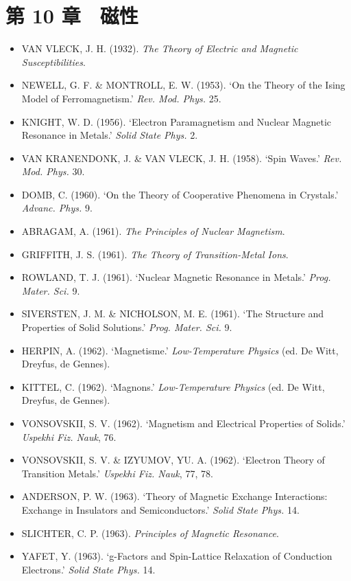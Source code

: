 \section*{第 10 章　磁性}

\begin{itemize}[leftmargin=2em, itemsep=0.2em]
\item VAN VLECK, J. H. (1932). \emph{The Theory of Electric and Magnetic Susceptibilities}.
\item NEWELL, G. F. \& MONTROLL, E. W. (1953). `On the Theory of the Ising Model of Ferromagnetism.' \emph{Rev. Mod. Phys.} 25.
\item KNIGHT, W. D. (1956). `Electron Paramagnetism and Nuclear Magnetic Resonance in Metals.' \emph{Solid State Phys.} 2.
\item VAN KRANENDONK, J. \& VAN VLECK, J. H. (1958). `Spin Waves.' \emph{Rev. Mod. Phys.} 30.
\item DOMB, C. (1960). `On the Theory of Cooperative Phenomena in Crystals.' \emph{Advanc. Phys.} 9.
\item ABRAGAM, A. (1961). \emph{The Principles of Nuclear Magnetism}.
\item GRIFFITH, J. S. (1961). \emph{The Theory of Transition-Metal Ions}.
\item ROWLAND, T. J. (1961). `Nuclear Magnetic Resonance in Metals.' \emph{Prog. Mater. Sci.} 9.
\item SIVERSTEN, J. M. \& NICHOLSON, M. E. (1961). `The Structure and Properties of Solid Solutions.' \emph{Prog. Mater. Sci.} 9.
\item HERPIN, A. (1962). `Magnetisme.' \emph{Low-Temperature Physics} (ed. De Witt, Dreyfus, de Gennes).
\item KITTEL, C. (1962). `Magnons.' \emph{Low-Temperature Physics} (ed. De Witt, Dreyfus, de Gennes).
\item VONSOVSKII, S. V. (1962). `Magnetism and Electrical Properties of Solids.' \emph{Uspekhi Fiz. Nauk}, 76.
\item VONSOVSKII, S. V. \& IZYUMOV, YU. A. (1962). `Electron Theory of Transition Metals.' \emph{Uspekhi Fiz. Nauk}, 77, 78.
\item ANDERSON, P. W. (1963). `Theory of Magnetic Exchange Interactions: Exchange in Insulators and Semiconductors.' \emph{Solid State Phys.} 14.
\item SLICHTER, C. P. (1963). \emph{Principles of Magnetic Resonance}.
\item YAFET, Y. (1963). `g-Factors and Spin-Lattice Relaxation of Conduction Electrons.' \emph{Solid State Phys.} 14.

\end{itemize}
